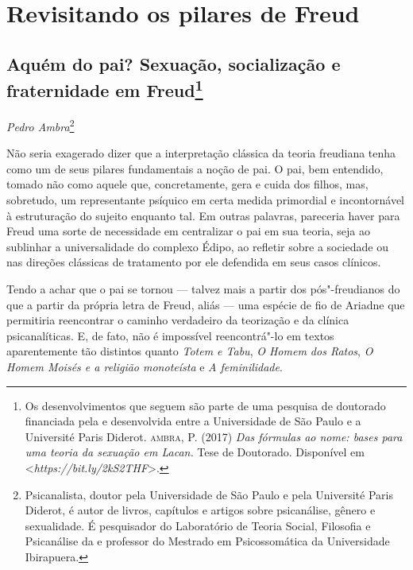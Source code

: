 \part{Revisitando os pilares de Freud}


\chapter*{Aquém do pai? Sexuação, socialização e fraternidade em
  Freud\footnote{Os desenvolvimentos que seguem são parte de uma
    pesquisa de doutorado financiada pela  e desenvolvida entre a
    Universidade de São Paulo e a Université Paris Diderot. \textsc{ambra}, P.
    (2017) \emph{Das fórmulas ao nome: bases para uma teoria da sexuação
    em Lacan.} Tese de Doutorado. Disponível em \textless{}\emph{https://bit.ly/2kS2THF}\textgreater{}.}}

\begin{flushright}
\emph{Pedro Ambra}\footnote{Psicanalista, doutor pela Universidade de São Paulo
  e pela Université Paris Diderot, é autor de livros, capítulos e artigos
  sobre psicanálise, gênero e sexualidade. É pesquisador do Laboratório
  de Teoria Social, Filosofia e Psicanálise da  e professor do
  Mestrado em Psicossomática da Universidade Ibirapuera.}
\end{flushright}

Não seria exagerado dizer que a interpretação clássica da teoria
freudiana tenha como um de seus pilares fundamentais a noção de pai. O
pai, bem entendido, tomado não como aquele que, concretamente, gera e
cuida dos filhos, mas, sobretudo, um representante psíquico em certa
medida primordial e incontornável à estruturação do sujeito enquanto
tal. Em outras palavras, pareceria haver para Freud uma sorte de
necessidade em centralizar o pai em sua teoria, seja ao sublinhar a
universalidade do complexo Édipo, ao refletir sobre a sociedade ou nas
direções clássicas de tratamento por ele defendida em seus casos
clínicos.

Tendo a achar que o pai se tornou --- talvez mais a partir dos
pós"-freudianos do que a partir da própria letra de Freud, aliás --- uma
espécie de fio de Ariadne que permitiria reencontrar o caminho
verdadeiro da teorização e da clínica psicanalíticas. E, de fato, não é
impossível reencontrá"-lo em textos aparentemente tão distintos quanto
\emph{Totem e Tabu}, \emph{O Homem dos Ratos}, \emph{O Homem Moisés e a
religião monoteísta} e \emph{A feminilidade}.

